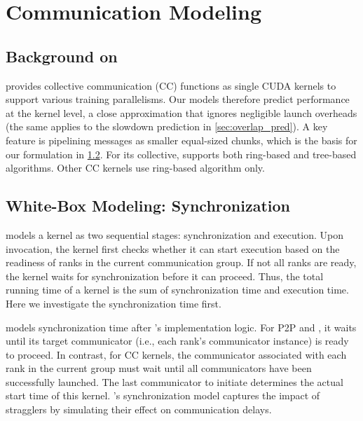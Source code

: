 \section{Communication Modeling}
\label{sec:comm_pred}

\subsection{Background on \nccl} 
\label{subsec:tree_allreduce}
\nccl provides collective communication (CC) functions as single CUDA kernels \cite{nccl} to support various training parallelisms. Our models therefore predict performance at the kernel level, a close approximation that ignores negligible launch overheads (the same applies to the slowdown prediction in \cref{sec:overlap_pred}). 
A key \nccl feature is pipelining messages as smaller equal-sized chunks, which is the basis for our formulation in \cref{subsec:whitebox_modeling}. For its \ar collective, \nccl supports both ring-based \cite{nccl} and tree-based \cite{tree} algorithms. Other CC kernels use ring-based algorithm only.

\subsection{White-Box Modeling: Synchronization}
\label{subsec:whitebox_modeling}

\noindent \sys models a \nccl kernel as two sequential stages: synchronization and execution. Upon invocation, the kernel first checks whether it can start execution based on the readiness of ranks in the current communication group. If not all ranks are ready, the kernel waits for synchronization before it can proceed. 
Thus, the total running time of a kernel is the sum of synchronization time and execution time.
Here we investigate the synchronization time first. 

\sys models synchronization time after \nccl's implementation logic.
For P2P \send and \recv, it waits until its target communicator (i.e., each rank's communicator instance) is ready to proceed. 
In contrast, for CC kernels, the communicator associated with each rank in the current group must wait until all communicators have been successfully launched. 
The last communicator to initiate determines the actual start time of this kernel.
\sys's synchronization model captures the impact of stragglers by simulating their effect on communication delays.



